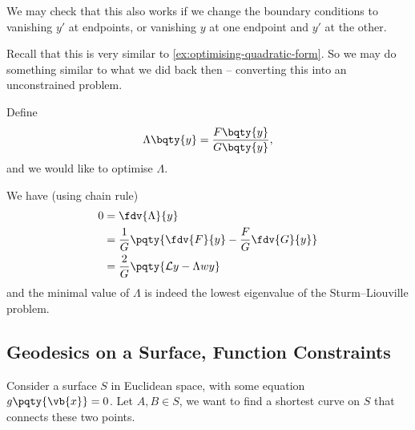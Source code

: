 We may check that this also works if we change the boundary conditions to vanishing \(y'\) at endpoints, or vanishing \(y\) at one endpoint and \(y'\) at the other.

Recall that this is very similar to \autoref{ex:optimising-quadratic-form}. So we may do something similar to what we did back then -- converting this into an unconstrained problem.

\begin{example}
    Define
    \[
        \Lambda \bqty{y} = \frac{F\bqty{y}}{G\bqty{y}},
    \]
    and we would like to optimise \(\Lambda\).

    We have (using chain rule)
    \begin{align*}
        0 &= \fdv{\Lambda}{y} \\
        &= \frac{1}{G} \pqty{\fdv{F}{y} - \frac{F}{G} \fdv{G}{y}} \\
        &= \frac{2}{G} \pqty{\mathcal{L} y - \Lambda w y}
    \end{align*}
    and the minimal value of \(\Lambda\) is indeed the lowest eigenvalue of the Sturm--Liouville problem.
\end{example}

\subsection{Geodesics on a Surface, Function Constraints}

Consider a surface \(S\) in Euclidean space, with some equation \(g\pqty{\vb{x}} = 0\). Let \(A, B \in S\), we want to find a shortest curve on \(S\) that connects these two points.

